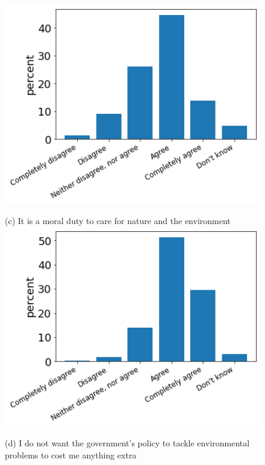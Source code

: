 \documentclass[12pt]{article}
\begin{document}
\begin{figure}[h!!]
\begin{minipage}[h!!]{0.32\textwidth}
		\includegraphics[width=1\textwidth]{../codding_data/results/liss/qk20a181title0.png}
	\end{minipage}
	\begin{minipage}[h!!]{0.32\textwidth}  
		\centering\footnotesize{(c) It is a moral duty to care for nature and the environment}
		\includegraphics[width=1\textwidth]{../codding_data/results/liss/qk20a183title0.png}
	\end{minipage}	
\begin{minipage}[h!!]{0.32\textwidth}  
\centering\footnotesize{(d) I do not want the government's policy to tackle environmental problems to cost me anything extra}

\end{minipage}
\end{figure}
\end{document}
